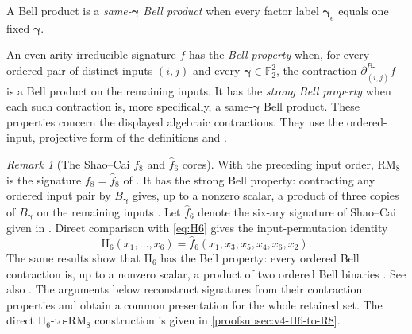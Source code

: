 \documentclass[11pt,letterpaper,onecolumn]{article}
\theoremstyle{plain}
\theoremstyle{definition}
\theoremstyle{remark}
\newtheorem{remark}[remark]{Remark}
\newcommand{\Ftwo}{\mathbb F_2}
\newcommand{\RMcore}{\mathrm{RM}_8}
\newcommand{\Hcore}{\mathrm{H}_6}
\begin{document}
A Bell product is a \emph{same-\({\boldsymbol{\gamma}}\) Bell product}
when every factor label \({\boldsymbol{\gamma}}_e\) equals one fixed \({\boldsymbol{\gamma}}\).

An even-arity irreducible signature \(f\) has the \emph{Bell property}
when, for every ordered pair of distinct inputs \((i,j)\) and every
\({\boldsymbol{\gamma}}\in\Ftwo^2\), the contraction
\(\partial_{(i,j)}^{B_{\boldsymbol{\gamma}}}f\) is a Bell product on the remaining inputs.
It has the \emph{strong Bell property} when each such contraction is, more
specifically, a same-\({\boldsymbol{\gamma}}\) Bell product.  These properties concern the displayed algebraic contractions.
They use the ordered-input, projective form of the definitions
\cite[full version, Definition~6.12]{ShaoCai2020} and
\cite[full version, Definition~1.10; conference version, Definition~12]%
{CaiFuShao2020Entanglement}.

\begin{remark}[The Shao--Cai \(f_8\) and \(\widehat f_6\) cores]
\label{rem:sc-f8-core}
\label{rem:sc-f6-core}
With the preceding input order, \(\RMcore\) is
the signature \(f_8=\widehat f_8\) of
\cite[full version, Section~8]{ShaoCai2020}. It has the strong Bell property:
contracting any ordered input pair by \(B_{\boldsymbol{\gamma}}\) gives, up to a nonzero
scalar, a product of three copies of \(B_{\boldsymbol{\gamma}}\) on the remaining inputs
\cite[Theorems~13--14]{CaiFuShao2020Entanglement}.
Let \(\widehat f_6\) denote the six-ary signature of Shao--Cai given in
\cite[full version, Eq.~(6.1)]{ShaoCai2020}.  Direct comparison with
\cref{eq:H6} gives the input-permutation identity
\[
 \Hcore(x_1,\ldots,x_6)
 =
 \widehat f_6(x_1,x_3,x_5,x_4,x_6,x_2).
\]
The same results show that \(\Hcore\) has the Bell property: every ordered
Bell contraction is, up to a nonzero scalar, a product of two ordered Bell
binaries
\cite[Theorems~13--14]{CaiFuShao2020Entanglement}. See also
\cite[full version, Definition~6.12 and Lemma~6.13]{ShaoCai2020}.
The arguments below reconstruct signatures from their contraction
properties and obtain a common presentation for the whole retained set.
The direct \(\Hcore\)-to-\(\RMcore\) construction is given in
\cref{proofsubsec:v4-H6-to-R8}.
\end{remark}
\end{document}
